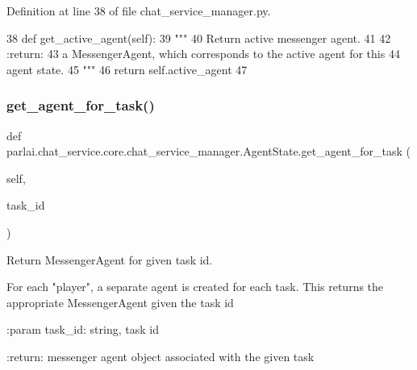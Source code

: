 Definition at line 38 of file chat\+\_\+service\+\_\+manager.\+py.


\begin{DoxyCode}
38     \textcolor{keyword}{def }get\_active\_agent(self):
39         \textcolor{stringliteral}{"""}
40 \textcolor{stringliteral}{        Return active messenger agent.}
41 \textcolor{stringliteral}{}
42 \textcolor{stringliteral}{        :return:}
43 \textcolor{stringliteral}{            a MessengerAgent, which corresponds to the active agent for this}
44 \textcolor{stringliteral}{            agent state.}
45 \textcolor{stringliteral}{        """}
46         \textcolor{keywordflow}{return} self.active\_agent
47 
\end{DoxyCode}
\mbox{\label{classparlai_1_1chat__service_1_1core_1_1chat__service__manager_1_1AgentState_ac8c982b90aef36093475088d15d46b72}} 
\subsubsection{\texorpdfstring{get\+\_\+agent\+\_\+for\+\_\+task()}{get\_agent\_for\_task()}}
{\footnotesize\ttfamily def parlai.\+chat\+\_\+service.\+core.\+chat\+\_\+service\+\_\+manager.\+Agent\+State.\+get\+\_\+agent\+\_\+for\+\_\+task (\begin{DoxyParamCaption}\item[{}]{self,  }\item[{}]{task\+\_\+id }\end{DoxyParamCaption})}

\begin{DoxyVerb}Return MessengerAgent for given task id.

For each "player", a separate agent is created for each task. This
returns the appropriate MessengerAgent given the task id

:param task_id:
    string, task id

:return:
    messenger agent object associated with the given task
\end{DoxyVerb}
 


